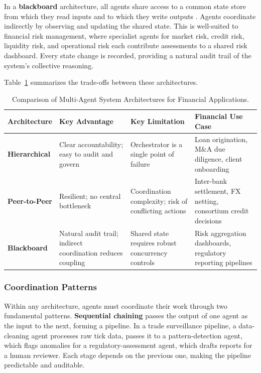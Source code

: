 \documentclass{article}
\begin{document}
In a \textbf{blackboard} architecture, all agents share access to a common state store from which they read inputs and to which they write outputs \cite{craig1988blackboard}. Agents coordinate indirectly by observing and updating the shared state. This is well-suited to financial risk management, where specialist agents for market risk, credit risk, liquidity risk, and operational risk each contribute assessments to a shared risk dashboard. Every state change is recorded, providing a natural audit trail of the system's collective reasoning.

Table~\ref{tab:mas-architecture-comparison} summarizes the trade-offs between these architectures.

\begin{table}[h!]
\centering
\caption{Comparison of Multi-Agent System Architectures for Financial Applications.}
\label{tab:mas-architecture-comparison}
\renewcommand{\arraystretch}{1.3}
\begin{tabular}{|p{2.5cm}|p{2.8cm}|p{2.8cm}|p{2.9cm}|}
\hline
\textbf{Architecture} & \textbf{Key Advantage} & \textbf{Key Limitation} & \textbf{Financial Use Case} \\
\hline
\textbf{Hierarchical} & Clear accountability; easy to audit and govern & Orchestrator is a single point of failure & Loan origination, M\&A due diligence, client onboarding \\
\hline
\textbf{Peer-to-Peer} & Resilient; no central bottleneck & Coordination complexity; risk of conflicting actions & Inter-bank settlement, FX netting, consortium credit decisions \\
\hline
\textbf{Blackboard} & Natural audit trail; indirect coordination reduces coupling & Shared state requires robust concurrency controls & Risk aggregation dashboards, regulatory reporting pipelines \\
\hline
\end{tabular}
\end{table}

\subsubsection{Coordination Patterns}

Within any architecture, agents must coordinate their work through two fundamental patterns. \textbf{Sequential chaining} passes the output of one agent as the input to the next, forming a pipeline. In a trade surveillance pipeline, a data-cleaning agent processes raw tick data, passes it to a pattern-detection agent, which flags anomalies for a regulatory-assessment agent, which drafts reports for a human reviewer. Each stage depends on the previous one, making the pipeline predictable and auditable.
\end{document}
